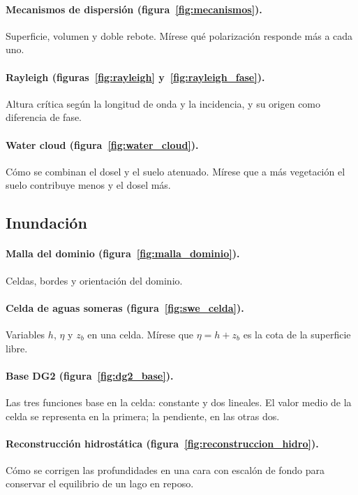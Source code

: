 \documentclass[11pt,a4paper]{article}
\begin{document}
\paragraph{Mecanismos de dispersión (figura~\ref{fig:mecanismos}).} Superficie, volumen y doble rebote.
Mírese qué polarización responde más a cada uno.

\paragraph{Rayleigh (figuras~\ref{fig:rayleigh} y~\ref{fig:rayleigh_fase}).} Altura crítica según la
longitud de onda y la incidencia, y su origen como diferencia de fase.

\paragraph{Water cloud (figura~\ref{fig:water_cloud}).} Cómo se combinan el dosel y el suelo atenuado. Mírese
que a más vegetación el suelo contribuye menos y el dosel más.

\subsection*{Inundación}

\paragraph{Malla del dominio (figura~\ref{fig:malla_dominio}).} Celdas, bordes y orientación del dominio.

\paragraph{Celda de aguas someras (figura~\ref{fig:swe_celda}).} Variables $h$, $\eta$ y $z_b$ en una celda.
Mírese que $\eta=h+z_b$ es la cota de la superficie libre.

\paragraph{Base DG2 (figura~\ref{fig:dg2_base}).} Las tres funciones base en la celda: constante y dos
lineales. El valor medio de la celda se representa en la primera; la pendiente, en las otras dos.

\paragraph{Reconstrucción hidrostática (figura~\ref{fig:reconstruccion_hidro}).} Cómo se corrigen las
profundidades en una cara con escalón de fondo para conservar el equilibrio de un lago en reposo.
\end{document}
